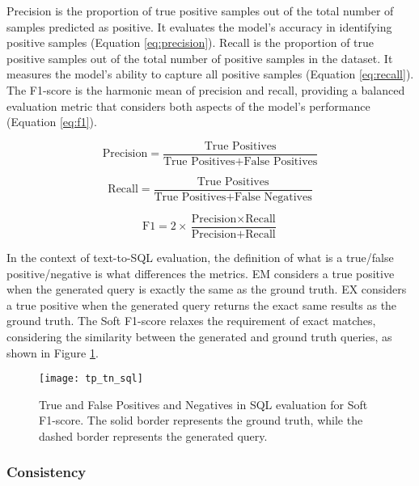 Precision is the proportion of true positive samples out of the total number of samples predicted as positive. It evaluates the model's accuracy in identifying positive samples (Equation \ref{eq:precision}). Recall is the proportion of true positive samples out of the total number of positive samples in the dataset. It measures the model's ability to capture all positive samples (Equation \ref{eq:recall}). The F1-score is the harmonic mean of precision and recall, providing a balanced evaluation metric that considers both aspects of the model's performance (Equation \ref{eq:f1}).

\begin{equation}
    \text{Precision} = \frac{\text{True Positives}}{\text{True Positives} + \text{False Positives}}
    \label{eq:precision}
\end{equation}

\begin{equation}
    \text{Recall} = \frac{\text{True Positives}}{\text{True Positives} + \text{False Negatives}}
    \label{eq:recall}
\end{equation}

\begin{equation}
    \text{F1} = 2 \times \frac{\text{Precision} \times \text{Recall}}{\text{Precision} + \text{Recall}}
    \label{eq:f1}
\end{equation}

In the context of text-to-SQL evaluation, the definition of what is a true/false positive/negative is what differences the metrics. EM considers a true positive when the generated query is exactly the same as the ground truth. EX considers a true positive when the generated query returns the exact same results as the ground truth. The Soft F1-score relaxes the requirement of exact matches, considering the similarity between the generated and ground truth queries, as shown in Figure \ref{fig:tp_tn_sql}.

\begin{figure}[htbp]
    \centering
    \texttt{[image: tp\_tn\_sql]}
    \caption{True and False Positives and Negatives in SQL evaluation for Soft F1-score. The solid border represents the ground truth, while the dashed border represents the generated query.}
    \label{fig:tp_tn_sql}
\end{figure}

\subsubsection{Consistency}


